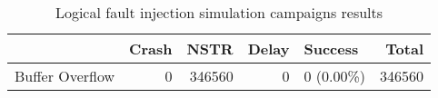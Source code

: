 \begin{table}[t]
\centering
\caption{Logical fault injection simulation campaigns results}
\label{table:end_sim_by_status_hamming_single_bitflip_temporel}
\begin{tabular}{lrrrlr}
\toprule
 & Crash & NSTR & Delay & Success & Total \\
\midrule
Buffer Overflow & 0 & 346560 & 0 & 0 (0.00\%) & 346560 \\
\bottomrule
\end{tabular}
\end{table}
